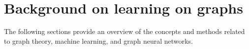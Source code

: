 









\chapter{Background on learning on graphs}\label{chap:background}
The following sections provide an overview of the concepts and methods related to graph theory, machine learning, and graph neural networks. 

